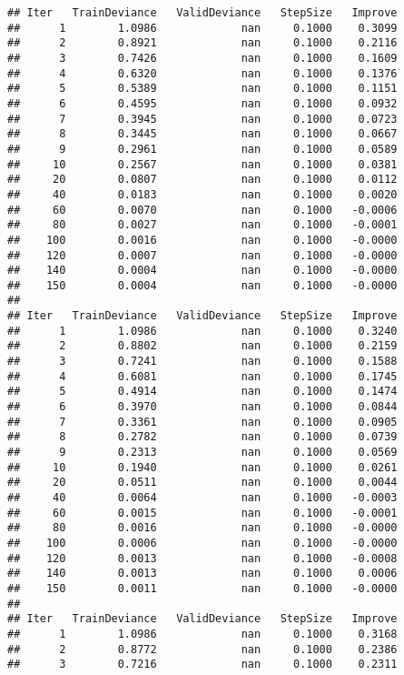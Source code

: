 \documentclass[
]{article}
\begin{document}
\begin{verbatim}
## Iter   TrainDeviance   ValidDeviance   StepSize   Improve
##      1        1.0986             nan     0.1000    0.3099
##      2        0.8921             nan     0.1000    0.2116
##      3        0.7426             nan     0.1000    0.1609
##      4        0.6320             nan     0.1000    0.1376
##      5        0.5389             nan     0.1000    0.1151
##      6        0.4595             nan     0.1000    0.0932
##      7        0.3945             nan     0.1000    0.0723
##      8        0.3445             nan     0.1000    0.0667
##      9        0.2961             nan     0.1000    0.0589
##     10        0.2567             nan     0.1000    0.0381
##     20        0.0807             nan     0.1000    0.0112
##     40        0.0183             nan     0.1000    0.0020
##     60        0.0070             nan     0.1000   -0.0006
##     80        0.0027             nan     0.1000   -0.0001
##    100        0.0016             nan     0.1000   -0.0000
##    120        0.0007             nan     0.1000   -0.0000
##    140        0.0004             nan     0.1000   -0.0000
##    150        0.0004             nan     0.1000   -0.0000
## 
## Iter   TrainDeviance   ValidDeviance   StepSize   Improve
##      1        1.0986             nan     0.1000    0.3240
##      2        0.8802             nan     0.1000    0.2159
##      3        0.7241             nan     0.1000    0.1588
##      4        0.6081             nan     0.1000    0.1745
##      5        0.4914             nan     0.1000    0.1474
##      6        0.3970             nan     0.1000    0.0844
##      7        0.3361             nan     0.1000    0.0905
##      8        0.2782             nan     0.1000    0.0739
##      9        0.2313             nan     0.1000    0.0569
##     10        0.1940             nan     0.1000    0.0261
##     20        0.0511             nan     0.1000    0.0044
##     40        0.0064             nan     0.1000   -0.0003
##     60        0.0015             nan     0.1000   -0.0001
##     80        0.0016             nan     0.1000   -0.0000
##    100        0.0006             nan     0.1000   -0.0000
##    120        0.0013             nan     0.1000   -0.0008
##    140        0.0013             nan     0.1000    0.0006
##    150        0.0011             nan     0.1000   -0.0000
## 
## Iter   TrainDeviance   ValidDeviance   StepSize   Improve
##      1        1.0986             nan     0.1000    0.3168
##      2        0.8772             nan     0.1000    0.2386
##      3        0.7216             nan     0.1000    0.2311

\end{verbatim}
\end{document}
